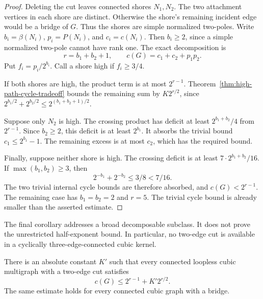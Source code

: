\begin{proof}
Deleting the cut leaves connected shores $N_1,N_2$.
The two attachment vertices in each shore are distinct.
Otherwise the shore's remaining incident edge would be a bridge of $G$.
Thus the shores are simple normalized two-poles.
Write $b_i=\beta(N_i)$, $p_i=P(N_i)$, and $c_i=c(N_i)$.
Then $b_i\ge2$, since a simple normalized two-pole cannot have rank one.
The exact decomposition is
\[
 r=b_1+b_2+1,\qquad c(G)=c_1+c_2+p_1p_2.
\]
Put $f_i=p_i/2^{b_i}$.
Call a shore high if $f_i\ge3/4$.

If both shores are high, the product term is at most $2^{r-1}$.
Theorem~\ref{thm:high-path-cycle-tradeoff} bounds the remaining sum by $K2^{r/2}$, since
$2^{b_1/2}+2^{b_2/2}\le2^{(b_1+b_2+1)/2}$.

Suppose only $N_2$ is high.
The crossing product has deficit at least $2^{b_1+b_2}/4$ from $2^{r-1}$.
Since $b_2\ge2$, this deficit is at least $2^{b_1}$.
It absorbs the trivial bound $c_1\le2^{b_1}-1$.
The remaining excess is at most $c_2$, which has the required bound.

Finally, suppose neither shore is high.
The crossing deficit is at least $7\cdot2^{b_1+b_2}/16$.
If $\max(b_1,b_2)\ge3$, then
\[
 2^{-b_1}+2^{-b_2}\le3/8<7/16.
\]
The two trivial internal cycle bounds are therefore absorbed, and $c(G)<2^{r-1}$.
The remaining case has $b_1=b_2=2$ and $r=5$.
The trivial cycle bound is already smaller than the asserted estimate.
\end{proof}

The final corollary addresses a broad decomposable subclass.
It does not prove the unrestricted half-exponent bound.
In particular, no two-edge cut is available in a cyclically three-edge-connected cubic kernel.

\begin{corollary}
\label{cor:cubic-multigraph-two-cut-error}
There is an absolute constant $K'$ such that every connected loopless cubic multigraph with a two-edge cut satisfies
\[
 c(G)\le2^{r-1}+K'2^{r/2}.
\]
The same estimate holds for every connected cubic graph with a bridge.
\end{corollary}

